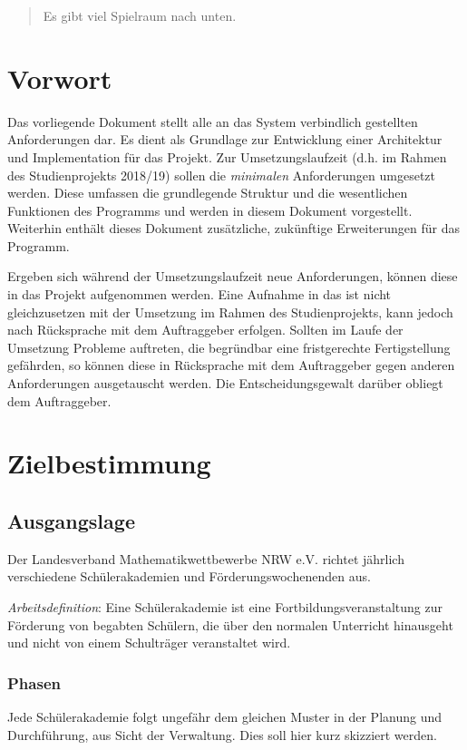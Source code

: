 \documentclass[a4paper]{scrartcl}
\begin{document}
	\vfill
	
	\begin{quote}
		\textsf{Es gibt viel Spielraum nach unten.}
	\end{quote}

\pagebreak
\eject

\section{Vorwort}
	Das vorliegende Dokument stellt alle an das System verbindlich gestellten Anforderungen dar. Es dient als Grundlage zur Entwicklung einer Architektur und Implementation für das Projekt. Zur Umsetzungslaufzeit (d.h. im Rahmen des Studienprojekts 2018/19) sollen die \emph{minimalen} Anforderungen umgesetzt werden. Diese umfassen die grundlegende Struktur und die wesentlichen Funktionen des Programms und werden in diesem Dokument vorgestellt. Weiterhin enthält dieses Dokument zusätzliche, zukünftige Erweiterungen für das Programm.
	
	Ergeben sich während der Umsetzungslaufzeit neue Anforderungen, können diese in das Projekt aufgenommen werden. Eine Aufnahme in das ist nicht gleichzusetzen mit der Umsetzung im Rahmen des Studienprojekts, kann jedoch nach Rücksprache mit dem Auftraggeber erfolgen. Sollten im Laufe der Umsetzung Probleme auftreten, die begründbar eine fristgerechte Fertigstellung gefährden, so können diese in Rücksprache mit dem Auftraggeber gegen anderen Anforderungen ausgetauscht werden. Die Entscheidungsgewalt darüber obliegt dem Auftraggeber.
	
\section{Zielbestimmung}
	\subsection{Ausgangslage}
	Der Landesverband Mathematikwettbewerbe NRW e.V. richtet jährlich verschiedene Schülerakademien und Förderungswochenenden aus.
	
	\emph{Arbeitsdefinition}: Eine Schülerakademie ist eine Fortbildungsveranstaltung zur Förderung von begabten Schülern, die über den normalen Unterricht hinausgeht und nicht von einem Schulträger veranstaltet wird.
	
	\subsubsection{Phasen}
	Jede Schülerakademie folgt ungefähr dem gleichen Muster in der Planung und Durchführung, aus Sicht der Verwaltung. Dies soll hier kurz skizziert werden.
	
\end{document}
